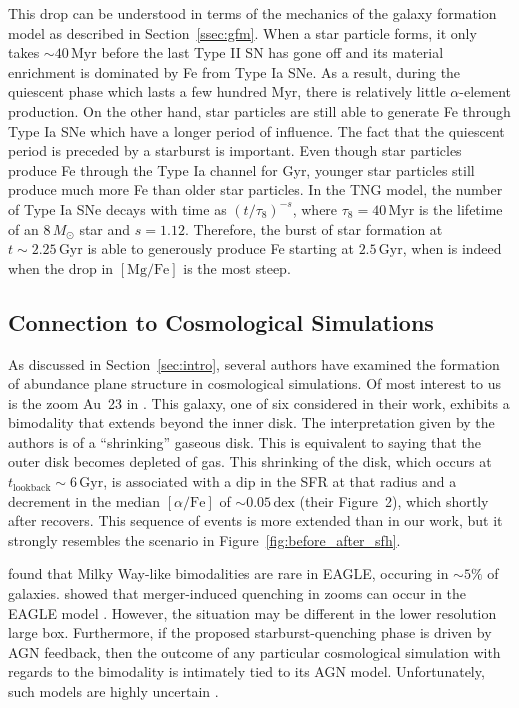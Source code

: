 \documentclass[twocolumn,linenumbers,trackchanges]{aastex631}
\newcommand{\Msun}{\ensuremath{M_{\odot}}}
\newcommand{\Gyr}{\ensuremath{\textrm{Gyr}}}
\newcommand{\Myr}{\ensuremath{\textrm{Myr}}}
\newcommand{\MgFe}{\ensuremath{[\textrm{Mg}/\textrm{Fe}]}}
\newcommand{\alphaFe}{\ensuremath{[\alpha/\textrm{Fe}]}}
\newcommand{\dex}{\ensuremath{\textrm{dex}}}
\begin{document}
This drop can be understood in terms of the mechanics of the galaxy formation model as described in Section~\ref{ssec:gfm}. When a star particle forms, it only takes $\sim40\,\Myr$ before the last Type II SN has gone off and its material enrichment is dominated by Fe from Type Ia SNe. As a result, during the quiescent phase which lasts a few hundred Myr, there is relatively little $\alpha$-element production. On the other hand, star particles are still able to generate Fe through Type Ia SNe which have a longer period of influence. The fact that the quiescent period is preceded by a starburst is important. Even though star particles produce Fe through the Type Ia channel for Gyr, younger star particles still produce much more Fe than older star particles. In the TNG model, the number of Type Ia SNe decays with time as $(t/\tau_8)^{-s}$, where $\tau_8=40\,\Myr$ is the lifetime of an $8\,\Msun$ star and $s=1.12$. Therefore, the burst of star formation at $t\sim2.25\,\Gyr$ is able to generously produce Fe starting at $2.5\,\Gyr$, when is indeed when the drop in \MgFe{} is the most steep.

\subsection{Connection to Cosmological Simulations}\label{ssec:cosmo}
As discussed in Section~\ref{sec:intro}, several authors have examined the formation of abundance plane structure in cosmological simulations. Of most interest to us is the zoom Au~23 in \citet{2018MNRAS.474.3629G}. This galaxy, one of six considered in their work, exhibits a bimodality that extends beyond the inner disk. The interpretation given by the authors is of a ``shrinking'' gaseous disk. This is equivalent to saying that the outer disk becomes depleted of gas. This shrinking of the disk, which occurs at $t_{\textrm{lookback}}\sim6\,\Gyr$, is associated with a dip in the SFR at that radius and a decrement in the median \alphaFe{} of $\sim0.05\,\dex$ (their Figure~2), which shortly after recovers. This sequence of events is more extended than in our work, but it strongly resembles the scenario in Figure~\ref{fig:before_after_sfh}.

\citet{2018MNRAS.477.5072M} found that Milky Way-like bimodalities are rare in EAGLE, occuring in $\sim5\%$ of galaxies. \citet{2021MNRAS.501..236D,2022MNRAS.515.1430D} showed that merger-induced quenching in zooms can occur in the EAGLE model \citep[see also][]{2017MNRAS.465..547P}. However, the situation may be different in the lower resolution large box. Furthermore, if the proposed starburst-quenching phase is driven by AGN feedback, then the outcome of any particular cosmological simulation with regards to the bimodality is intimately tied to its AGN model. Unfortunately, such models are highly uncertain \citep[e.g.][]{2022MNRAS.511.3751H}.
\end{document}

